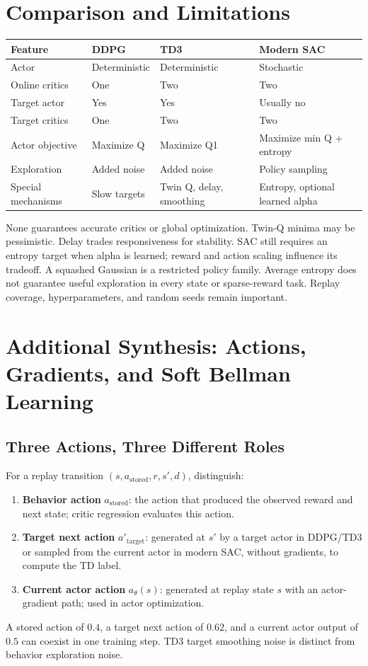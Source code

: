 \section{Comparison and Limitations}
\begin{center}
\small
\begin{tabular}{p{}p{}p{}p{}}
\toprule Feature & DDPG & TD3 & Modern SAC\\
\midrule
Actor & Deterministic & Deterministic & Stochastic\\
Online critics & One & Two & Two\\
Target actor & Yes & Yes & Usually no\\
Target critics & One & Two & Two\\
Actor objective & Maximize Q & Maximize Q1 & Maximize min Q + entropy\\
Exploration & Added noise & Added noise & Policy sampling\\
Special mechanisms & Slow targets & Twin Q, delay, smoothing & Entropy, optional learned alpha\\
\bottomrule
\end{tabular}
\normalsize
\end{center}
None guarantees accurate critics or global optimization.
Twin-Q minima may be pessimistic. Delay trades responsiveness for
stability. SAC still requires an entropy target when alpha is learned;
reward and action scaling influence its tradeoff.
A squashed Gaussian is a restricted policy family. Average entropy
does not guarantee useful exploration in every state or sparse-reward task.
Replay coverage, hyperparameters, and random seeds remain important.

\section{Additional Synthesis: Actions, Gradients, and Soft Bellman Learning}
\subsection{Three Actions, Three Different Roles}
For a replay transition $(s,a_{\mathrm{stored}},r,s',d)$, distinguish:
\begin{enumerate}
\item \textbf{Behavior action} $a_{\mathrm{stored}}$: the action that produced the observed reward and next state; critic regression evaluates this action.
\item \textbf{Target next action} $a'_{\mathrm{target}}$: generated at $s'$ by a target actor in DDPG/TD3 or sampled from the current actor in modern SAC, without gradients, to compute the TD label.
\item \textbf{Current actor action} $a_\theta(s)$: generated at replay state $s$ with an actor-gradient path; used in actor optimization.
\end{enumerate}
A stored action of $0.4$, a target next action of $0.62$, and a current actor output of $0.5$ can coexist in one training step. TD3 target smoothing noise is distinct from behavior exploration noise.

